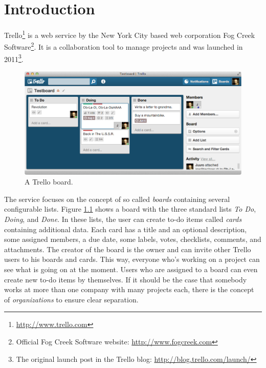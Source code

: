 \onehalfspacing
\chapter{Introduction}
\label{Introduction}
Trello\footnote{\url{http://www.trello.com}} is a web service by the New York City based web corporation Fog Creek Software\footnote{Official Fog Creek Software website: \url{http://www.fogcreek.com}}. It is a collaboration tool to manage projects and was launched in 2011\footnote{The original launch post in the Trello blog: \url{http://blog.trello.com/launch/}}. 

\begin{figure}[htb]
\centering
\includegraphics[width=\textwidth]{figures/trello}
\caption{A Trello board.}
\label{fig:trello}
\end{figure}

The service focuses on the concept of so called \emph{boards} containing several configurable lists. Figure \ref{fig:trello} shows a board with the three standard lists \emph{To Do}, \emph{Doing}, and \emph{Done}. In these lists, the user can create to-do items called \emph{cards} containing additional data. Each card has a title and an optional description, some assigned members, a due date, some labels, votes, checklists, comments, and attachments. The creator of the board is the owner and can invite other Trello users to his boards and cards. This way, everyone who's working on a project can see what is going on at the moment. Users who are assigned to a board can even create new to-do items by themselves. If it should be the case that somebody works at more than one company with many projects each, there is the concept of \emph{organizations} to ensure clear separation.

